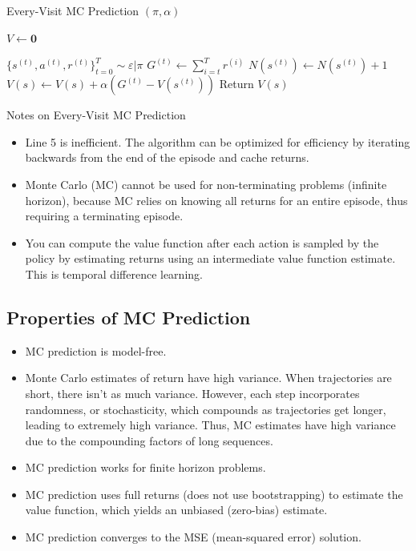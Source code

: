 \documentclass[11pt]{article}
\begin{document}
\begin{algorithm}[H]
\caption{Every-Visit MC Prediction $(\pi, \alpha)$}
\label{algo:EVMC}
\begin{algorithmic}[1]
\STATE $V \leftarrow \mathbf{0}$ \hfill
{}

\STATE $\{s^{(t)}, a^{(t)}, r^{(t)}\}_{t=0}^T \sim \varepsilon|\pi$ \hfill 
{}
\STATE $G^{(t)} \leftarrow \sum_{i=t}^T r^{(i)}$ \hfill 
\STATE $N(s^{(t)}) \leftarrow N(s^{(t)})  + 1$ \hfill 
\STATE $V(s) \leftarrow V(s) + \alpha(G^{(t)}-V(s^{(t)}))$  \hfill
\ENDFOR
\ENDFOR
\STATE Return $V(s)$  \hfill
\end{algorithmic}
\end{algorithm}

Notes on Every-Visit MC Prediction
\begin{itemize}
    \item Line 5 is inefficient. The algorithm can be optimized for efficiency by iterating backwards from the end of the episode and cache returns. 
    \item Monte Carlo (MC) cannot be used for non-terminating problems (infinite horizon), because MC relies on knowing all returns for an entire episode, thus requiring a terminating episode. 
    \item You can compute the value function after each action is sampled by the policy by estimating returns using an intermediate value function estimate. This is temporal difference learning.
\end{itemize}

\subsection{Properties of MC Prediction}
\begin{itemize}
    \item MC prediction is model-free.
    \item Monte Carlo estimates of return have high variance. When trajectories are short, there isn't as much variance. However, each step incorporates randomness, or stochasticity, which compounds as trajectories get longer, leading to extremely high variance. Thus, MC estimates have high variance due to the compounding factors of long sequences. 
    \item MC prediction works for finite horizon problems.
    \item MC prediction uses full returns (does not use bootstrapping) to estimate the value function, which yields an unbiased (zero-bias) estimate.
    \item MC prediction converges to the MSE (mean-squared error) solution. 
\end{itemize}
\end{document}
